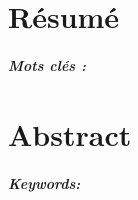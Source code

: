 
\chapter*{Résumé}
	
   \paragraph{Mots clés :}
   
\clearemptydoublepage
   
 \chapter*{Abstract}
 
   \paragraph{Keywords:}
